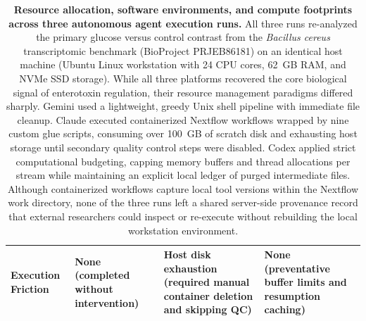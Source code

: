 \documentclass[11pt,letterpaper]{article}
\newcommand{\tool}[1]{\textsf{#1}}
\begin{document}
\begin{table}[!htbp]
\begin{tabularx}{\textwidth}{p{2.8cm}XXX}
\addlinespace
\textbf{Execution Friction} & None (completed without intervention) & Host disk exhaustion (required manual container deletion and skipping QC) & None (preventative buffer limits and resumption caching) \\
\bottomrule
\end{tabularx}
\caption{\textbf{Resource allocation, software environments, and compute footprints across three autonomous agent execution runs.} 
All three runs re-analyzed the primary glucose versus control contrast from the \textit{Bacillus cereus} transcriptomic benchmark (BioProject PRJEB86181) on an identical host machine (Ubuntu Linux workstation with 24 CPU cores, 62~GB RAM, and NVMe SSD storage). While all three platforms recovered the core biological signal of enterotoxin regulation, their resource management paradigms differed sharply. Gemini used a lightweight, greedy Unix shell pipeline with immediate file cleanup. Claude executed containerized \tool{Nextflow} workflows wrapped by nine custom glue scripts, consuming over 100~GB of scratch disk and exhausting host storage until secondary quality control steps were disabled. Codex applied strict computational budgeting, capping memory buffers and thread allocations per stream while maintaining an explicit local ledger of purged intermediate files. Although containerized workflows capture local tool versions within the \tool{Nextflow} work directory, none of the three runs left a shared server-side provenance record that external researchers could inspect or re-execute without rebuilding the local workstation environment.}
\label{tab:agent_resources}
\end{table}

\clearpage
\end{document}
